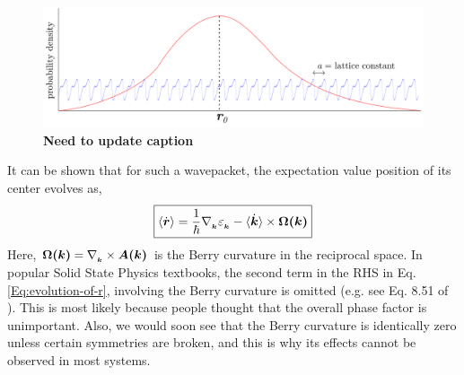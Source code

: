\documentclass{revtex4-2}
\renewcommand\vec[1]{\ensuremath\boldsymbol{#1}} %
\begin{document}
\begin{figure}[h!]
	\centering
	\includegraphics[width=0.7\linewidth]{wavepacket-and-Bloch-wave}
	\caption{\textbf{Need to update caption}}
	\label{fig:wavepacket-and-bloch-wave}
\end{figure}

It can be shown \cite{ralph2020berry} that for such a wavepacket, the expectation value position of its center evolves as,
\begin{equation}\label{Eq:evolution-of-r}
	\boxed{\langle\dot{\vec{r}}\rangle = \frac{1}{\hbar} \nabla{_{_{\vec{k}}}} \varepsilon_{_{\vec{k}}} - \langle\dot{\vec{k}}\rangle \times \vec{\Omega(\vec{k})}}
\end{equation}
Here, $\vec{\Omega(\vec{k})} = \nabla_{_{\vec{k}}} \times \vec{A(\vec{k})}$ is the Berry curvature in the reciprocal space. In popular Solid State Physics textbooks, the second term in the RHS in Eq. \eqref{Eq:evolution-of-r}, involving the Berry curvature is omitted (e.g. see Eq. 8.51 of \cite{AshcroftMermin76}). This is most likely because people thought that the overall phase factor is unimportant. Also, we would soon see that the Berry curvature is identically zero unless certain symmetries are broken, and this is why its effects cannot be observed in most systems. 
\end{document}
